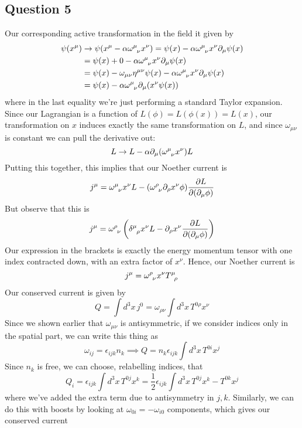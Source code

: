 \subsection{Question 5} 
Our corresponding active transformation in the field it given by 
\begin{align*} 
\psi(x^\mu)  & \rightarrow \psi(x^\mu  - \alpha \omega\indices{^\mu_ \nu}x^\nu)  = \psi( x)  - \alpha \omega\indices{^\mu_\nu} x^\nu  \partial_\mu \psi (x) \\
& =  \psi( x)  + 0  - \alpha \omega\indices{^\mu_\nu} x^\nu  \partial_\mu \psi (x)\\
&= \psi( x)  - \omega_{ \mu \nu } \eta^{\mu \nu} \psi ( x) - \alpha \omega\indices{^\mu_\nu} x^\nu  \partial_\mu \psi (x)\\
&=  \psi( x)  - \alpha \omega\indices{^\mu_\nu} \partial_\mu  (  x^\nu \psi (x)) 
\end{align*} 
where in the last equality we're just performing a standard Taylor expansion. 
Since our Lagrangian is a function of $L ( \phi) = L ( \phi(x) ) = L (x) $, our transformation on $x$ induces exactly the same transformation on $L$, and since $\omega_{ \mu\nu} $ is constant we can pull the derivative out: 
\[ 
L \rightarrow L - \alpha \partial_\mu (\omega\indices{^\mu_\nu}x^\nu ) L 
\] 
Putting this together, this implies that our Noether current is 
\[ 
j^\mu  =  \omega\indices{^\mu_\nu} x^\nu L - (\omega\indices{^\rho_\nu} \partial_\rho x^\nu \phi) \frac{ \partial L }{ \partial ( \partial_\mu \phi ) } 
\] 
But observe that this is 
\[ 
j^\mu = \omega\indices{^\rho_\nu} \left( \delta\indices{^\mu_\rho} x^\nu L  -  \partial_\rho x^\nu  \frac{ \partial L }{ \partial ( \partial_\mu \phi )} \right) 
\] 
Our expression in the brackets is exactly the energy momentum tensor with one index contracted down, with an extra factor of $x^\nu$. Hence, our Noether current is 
\[ 
j^\mu  =  \omega\indices{^\rho_\nu} x^\nu T\indices{^\mu_\rho} 
\] 
Our conserved current is given by 
\[ 
Q = \int d^3 x \, j^0 = \omega_{ \rho \nu } \int d^3 x \, T^{ 0 \rho } x^\nu 
\] 
Since we shown earlier that $\omega_{ \mu \nu } $ is antisymmetric, if we consider indices only in the spatial part, we can write this thing as 
\[ 
\omega_{ij}  = \epsilon_{ijk} n_k \implies Q = n_k \epsilon_{ijk} \int d^3 x\,  T^{0i} x^j 
\] 
Since $n_k$ is free, we can choose, relabelling indices, that 
\[ 
Q_i =  \epsilon_{ ijk} \int d^3 x \, T^{ 0j} x^k = \frac{1}{2} \epsilon_{ ijk} \int d^3 x \, T^{ 0j} x^k - T^{ 0k } x^j 
\] 
where we've added the extra term due to antisymmetry in $j, k$. 
Similarly, we can do this with boosts by looking at $\omega_{ 0i} =  - \omega_{ i0} $ components, which gives our conserved current 
